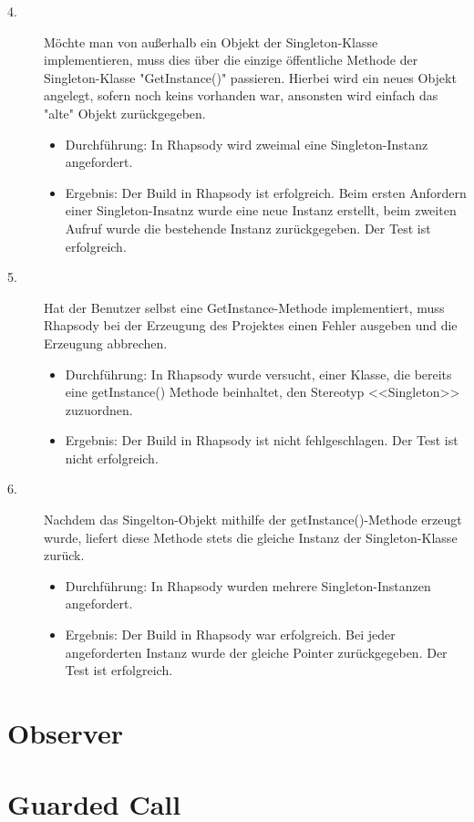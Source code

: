 \begin{description}
  \item[4.]
  Möchte man von außerhalb ein Objekt der Singleton-Klasse implementieren, muss dies über die einzige öffentliche Methode der Singleton-Klasse "GetInstance()" passieren. Hierbei wird ein neues Objekt angelegt, sofern noch keins vorhanden war, ansonsten wird einfach das "alte" Objekt zurückgegeben.
  \begin{itemize}
  	\item{Durchführung:}
  	In Rhapsody wird zweimal eine Singleton-Instanz angefordert.
  	\item{Ergebnis:}
  	Der Build in Rhapsody ist erfolgreich. Beim ersten Anfordern einer
  	Singleton-Insatnz wurde eine neue Instanz erstellt, beim zweiten Aufruf wurde
  	die bestehende Instanz zurückgegeben.
  	Der Test ist erfolgreich.
  \end{itemize}
  
  \item[5.]
  Hat der Benutzer selbst eine GetInstance-Methode implementiert, muss Rhapsody bei der Erzeugung des Projektes einen Fehler ausgeben und die Erzeugung abbrechen.
  \begin{itemize}
  \item{Durchführung:}
  In Rhapsody wurde versucht, einer Klasse, die bereits eine getInstance()
  Methode beinhaltet, den Stereotyp <<Singleton>> zuzuordnen.
  \item{Ergebnis:}
  Der Build in Rhapsody ist nicht fehlgeschlagen. Der Test ist nicht
  erfolgreich.
  \end{itemize}
  
  \item[6.]
  Nachdem das Singelton-Objekt mithilfe der getInstance()-Methode erzeugt wurde, liefert diese Methode stets die gleiche Instanz der Singleton-Klasse zurück. 
  \begin{itemize}
  	\item{Durchführung:}
  	In Rhapsody wurden mehrere Singleton-Instanzen angefordert.
  	\item{Ergebnis:}
  	Der Build in Rhapsody war erfolgreich. Bei jeder angeforderten Instanz
  	wurde der gleiche Pointer zurückgegeben. Der Test ist erfolgreich.
  \end{itemize} 
   
\end{description}

\section{Observer}

\section{Guarded Call}


